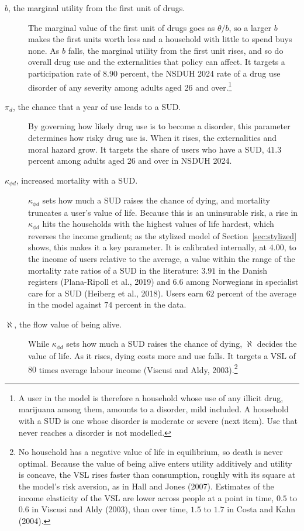 \documentclass[10pt]{article}
\begin{document}
\begin{description}
\item[$b$, the marginal utility from the first unit of drugs.] The marginal value of the first unit of drugs goes as $\theta/b$, so a larger $b$ makes the first units worth less and a household with little to spend buys none. As $b$ falls, the marginal utility from the first unit rises, and so do overall drug use and the externalities that policy can affect. It targets a participation rate of $8.90$ percent, the NSDUH 2024 rate of a drug use disorder of any severity among adults aged 26 and over.\footnote{A user in the model is therefore a household whose use of any illicit drug, marijuana among them, amounts to a disorder, mild included. A household with a SUD is one whose disorder is moderate or severe (next item). Use that never reaches a disorder is not modelled.}
\item[$\pi_d$, the chance that a year of use leads to a SUD.]   By governing how likely drug use is to become a disorder, this parameter determines how risky drug use is. When it rises, the externalities and moral hazard grow. It targets the share of users who have a SUD, $41.3$ percent among adults aged 26 and over in NSDUH 2024.
\item[$\kappa_{\phi d}$, increased mortality with a SUD.] $\kappa_{\phi d}$ sets how much a SUD raises the chance of dying, and mortality truncates a user's value of life. Because this is an uninsurable risk, a rise in $\kappa_{\phi d}$ hits the households with the highest values of life hardest, which reverses the income gradient; as the stylized model of Section~\ref{sec:stylized} shows, this makes it a key parameter. It is calibrated internally, at $4.00$, to the income of users relative to the average, a value within the range of the mortality rate ratios of a SUD in the literature: $3.91$ in the Danish registers (Plana-Ripoll et al., 2019) and $6.6$ among Norwegians in specialist care for a SUD (Heiberg et al., 2018). Users earn $62$ percent of the average in the model against $74$ percent in the data.
\item[$\aleph$, the flow value of being alive.]   While $\kappa_{\phi d}$ sets how much a SUD raises the chance of dying, $\aleph$ decides the value of life. As it rises, dying costs more and use falls. It targets a VSL of $80$ times average labour income (Viscusi and Aldy, 2003).\footnote{No household has a negative value of life in equilibrium, so death is never optimal. Because the value of being alive enters utility additively and utility is concave, the VSL rises faster than consumption, roughly with its square at the model's risk aversion, as in Hall and Jones (2007). Estimates of the income elasticity of the VSL are lower across people at a point in time, $0.5$ to $0.6$ in Viscusi and Aldy (2003), than over time, $1.5$ to $1.7$ in Costa and Kahn (2004).}
\end{description}
\end{document}
